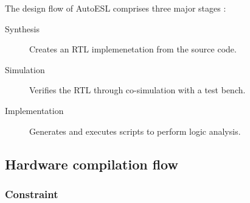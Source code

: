 The design flow of AutoESL comprises three major stages \cite{XILINX:Tutorial}:
\begin{description}
    \item[Synthesis] Creates an \gls{RTL} implemenetation from the source code.
    \item[Simulation] Verifies the \gls{RTL} through co-simulation with a test
        bench.
    \item[Implementation] Generates and executes scripts to perform logic
        analysis.
\end{description}

\subsection{Hardware compilation flow}
\label{hardwareCompilationFlow}

\subsubsection{Constraint}
\label{hardwareCompilationFlow:constraints}

